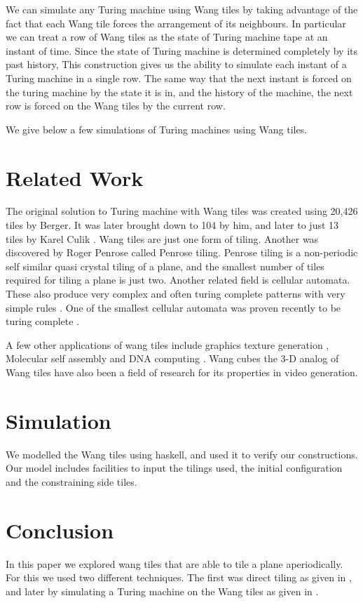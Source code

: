 \documentclass{article}
\begin{document}
We can simulate any Turing machine using Wang tiles by taking advantage of the fact that each Wang tile forces the arrangement of its neighbours. In particular we can treat a row of Wang tiles as the state of Turing machine tape at an instant of time. Since the state of Turing machine is determined completely by its past history, This construction gives us the ability to simulate each instant of a Turing machine in a single row. The same way that the next instant is forced on the turing machine by the state it is in, and the history of the machine, the next row is forced on the Wang tiles by the current row.

We give below a few simulations of Turing machines using Wang tiles.


\section*{Related Work}
The original solution to Turing machine with Wang tiles was created using 20,426 tiles by Berger. It was later brought down to 104 by him, and later to just 13 tiles by Karel Culik \cite{culik}. Wang tiles are just one form of tiling. Another was discovered by Roger Penrose called Penrose tiling. Penrose tiling \cite{penrose} is a non-periodic self similar quasi crystal tiling of a plane, and the smallest number of tiles required for tiling a plane is just two. Another related field is cellular automata. These also produce very complex and often turing complete patterns with very simple rules \cite{wolfram}. One of the smallest cellular automata was proven recently to be turing complete \cite{cook}.

A few other applications of wang tiles include graphics texture generation \cite{texture}, Molecular self assembly \cite{assembly} and DNA computing \cite{dna}. Wang cubes \cite{cubes} the 3-D analog of Wang tiles have also been a field of research for its properties in video generation.

\section*{Simulation}
We modelled the Wang tiles using haskell, and used it to verify our constructions. Our model includes facilities to input the tilings used, the initial configuration and the constraining side tiles. 

\section*{Conclusion}
In this paper we explored wang tiles that are able to tile a plane aperiodically. For this we used two different techniques. The first was direct tiling as given in \cite{tilings}, and later by simulating a Turing machine on the Wang tiles as given in \cite{tmtiles}.

\end{document}
